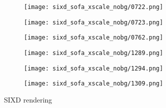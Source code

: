 \begin{figure}[h!]
\begin{subfigure}[b]{0.32\linewidth}
    \texttt{[image: sixd\_sofa\_xscale\_nobg/0722.png]}
  \end{subfigure}
  \begin{subfigure}[b]{0.32\linewidth}
    \texttt{[image: sixd\_sofa\_xscale\_nobg/0723.png]}
  \end{subfigure}
  \begin{subfigure}[b]{0.32\linewidth}
    \texttt{[image: sixd\_sofa\_xscale\_nobg/0762.png]}
  \end{subfigure}
  \begin{subfigure}[b]{0.32\linewidth}
    \texttt{[image: sixd\_sofa\_xscale\_nobg/1289.png]}
  \end{subfigure}
  \begin{subfigure}[b]{0.32\linewidth}
    \texttt{[image: sixd\_sofa\_xscale\_nobg/1294.png]}
  \end{subfigure}
  \begin{subfigure}[b]{0.32\linewidth}
    \texttt{[image: sixd\_sofa\_xscale\_nobg/1309.png]}
  \end{subfigure}
  \caption{SIXD rendering }
  \label{fig:sixd_sofa_xscale_nobg}
\end{figure}

